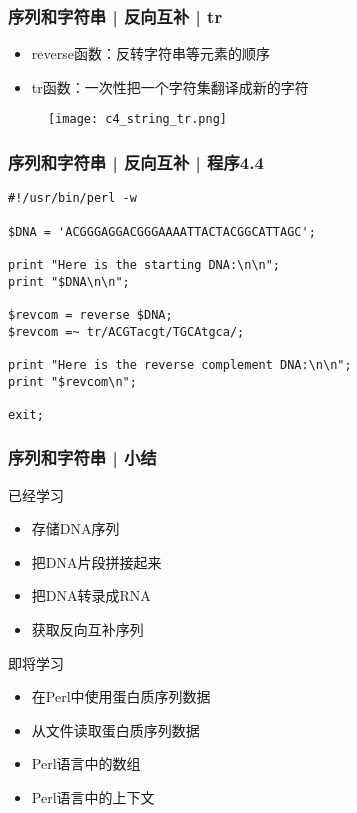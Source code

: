 \begin{frame}
  \frametitle{序列和字符串 | 反向互补 | \alert{tr}}
  \begin{itemize}
    \item reverse函数：反转字符串等元素的顺序
    \item tr函数：一次性把一个字符集翻译成新的字符
  \end{itemize}
  \begin{figure}
    \centering
    \texttt{[image: c4\_string\_tr.png]}
  \end{figure}
\end{frame}

\begin{frame}[fragile]
  \frametitle{序列和字符串 | 反向互补 | \alert{程序4.4}}
  \vspace{-1.5em}
\begin{lstlisting}
#!/usr/bin/perl -w

$DNA = 'ACGGGAGGACGGGAAAATTACTACGGCATTAGC';

print "Here is the starting DNA:\n\n";
print "$DNA\n\n";

$revcom = reverse $DNA;
$revcom =~ tr/ACGTacgt/TGCAtgca/;

print "Here is the reverse complement DNA:\n\n";
print "$revcom\n";

exit;
\end{lstlisting}
\end{frame}

\begin{frame}
  \frametitle{序列和字符串 | 小结}
  \begin{block}{已经学习}
    \begin{itemize}
      \item 存储DNA序列
      \item 把DNA片段拼接起来
      \item 把DNA转录成RNA
      \item 获取反向互补序列
    \end{itemize}
  \end{block}
  \pause
  \begin{block}{即将学习}
    \begin{itemize}
      \item 在Perl中使用蛋白质序列数据
      \item 从文件读取蛋白质序列数据
      \item Perl语言中的数组
      \item Perl语言中的上下文
    \end{itemize}
  \end{block}
\end{frame}

